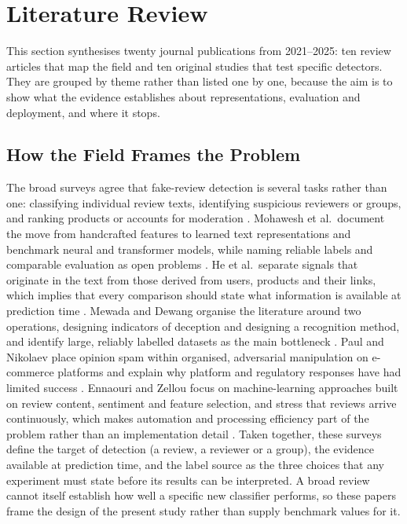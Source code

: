 \section{Literature Review}
\label{sec:litreview}
This section synthesises twenty journal publications from 2021--2025: ten review articles that map the field and ten original studies that test specific detectors. They are grouped by theme rather than listed one by one, because the aim is to show what the evidence establishes about representations, evaluation and deployment, and where it stops.

\subsection{How the Field Frames the Problem}
The broad surveys agree that fake-review detection is several tasks rather than one: classifying individual review texts, identifying suspicious reviewers or groups, and ranking products or accounts for moderation \cite{ref13,ref8,ref12}. Mohawesh et al.\ document the move from handcrafted features to learned text representations and benchmark neural and transformer models, while naming reliable labels and comparable evaluation as open problems \cite{ref13}. He et al.\ separate signals that originate in the text from those derived from users, products and their links, which implies that every comparison should state what information is available at prediction time \cite{ref8}. Mewada and Dewang organise the literature around two operations, designing indicators of deception and designing a recognition method, and identify large, reliably labelled datasets as the main bottleneck \cite{ref12}. Paul and Nikolaev place opinion spam within organised, adversarial manipulation on e-commerce platforms and explain why platform and regulatory responses have had limited success \cite{ref16}. Ennaouri and Zellou focus on machine-learning approaches built on review content, sentiment and feature selection, and stress that reviews arrive continuously, which makes automation and processing efficiency part of the problem rather than an implementation detail \cite{ref5}. Taken together, these surveys define the target of detection (a review, a reviewer or a group), the evidence available at prediction time, and the label source as the three choices that any experiment must state before its results can be interpreted. A broad review cannot itself establish how well a specific new classifier performs, so these papers frame the design of the present study rather than supply benchmark values for it.

